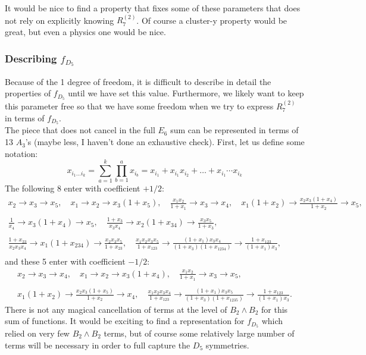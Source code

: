 \documentclass[12pt]{article}
\def\a{\mathcal{A}}
\def\fd5{f_{D_5}}
\def\a2{A_2}
\def\a3{A_3}
\def\d5{D_5}
\def\e6{E_6}
\def\r27{R^{(2)}_7}
\def\bb2{B_2\wedge B_2}
\begin{document}
It would be nice to find a property that fixes some of these parameters that does not rely on explicitly knowing $\r27$. Of course a cluster-y property would be great, but even a physics one would be nice. 

\subsubsection*{Describing $\fd5$}

Because of the 1 degree of freedom, it is difficult to describe in detail the properties of $\fd5$ until we have set this value. Furthermore, we likely want to keep this parameter free so that we have some freedom when we try to express $\r27$ in terms of $\fd5$. \\

The piece that does not cancel in the full $\e6$ sum can be represented in terms of 13 $\a3$'s (maybe less, I haven't done an exhaustive check). First, let us define some notation:
\begin{equation}
	x_{i_1\ldots i_k} = \sum_{a=1}^k \prod_{b=1}^a x_{i_b} = x_{i_1}+x_{i_1}x_{i_2} + \ldots + x_{i_1}\cdots x_{i_k}
\end{equation}
The following 8 enter with coefficient $+1/2$:
\begin{gather*}
	x_2\to x_3\to x_5,\quad x_1\to x_2\to x_3 \left(1+x_5\right),\quad \frac{x_1 x_2}{1+x_1}\to x_3\to x_4,\quad x_1\left(1+x_2\right)\to \frac{x_2 x_3\left(1+x_4\right)}{1+x_2}\to x_5,\\ \\
	\frac{1}{x_4}\to x_3 \left(1+x_4\right)\to x_5,\quad \frac{1+x_3}{x_3x_4}\to x_2 (1+x_{34})\to \frac{x_3x_5}{1+x_3},\\ \\
	\frac{1+x_{23}}{x_2 x_3 x_4}\to x_1(1+x_{234})\to \frac{x_2x_3 x_5}{1+x_{23}},\quad
	\frac{x_1 x_2 x_3x_5}{1+x_{123}}\to\frac{\left(1+x_1\right) x_3 x_4}{\left(1+x_3\right)\left(1+x_{1234}\right)}\to \frac{1+x_{123}}{\left(1+x_1\right) x_3},\\
\end{gather*}
and these 5 enter with coefficient $-1/2$:
\begin{gather*}
	x_2\to x_3\to x_4,\quad x_1\to x_2\to x_3 \left(1+x_4\right),\quad \frac{x_1 x_2}{1+x_1}\to x_3\to x_5,\\ \\ x_1\left(1+x_2\right)\to \frac{x_2 x_3\left(1+x_5\right)}{1+x_2}\to x_4,\quad
	\frac{x_1 x_2 x_3x_4}{1+x_{123}}\to\frac{\left(1+x_1\right) x_3 x_5}{\left(1+x_3\right)\left(1+x_{1235}\right)}\to \frac{1+x_{123}}{\left(1+x_1\right) x_3}.
\end{gather*}
There is not any magical cancellation of terms at the level of $\bb2$ for this sum of functions. It would be exciting to find a representation for $\fd5$ which relied on very few $\bb2$ terms, but of course some relatively large number of terms will be necessary in order to full capture the $\d5$ symmetries. \\
\end{document}
